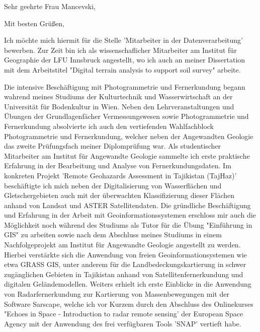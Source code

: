 \documentclass[11pt,a4paper,sans]{moderncv}        %
\begin{document}

\date{22. Nov, 2018}
\opening{Sehr geehrte Frau Mancevski,}
\closing{Mit besten Gr\"{u}{\ss}en,}

\makelettertitle
\justify
Ich m\"{o}chte mich hiermit f\"{u}r die Stelle 'Mitarbeiter in der Datenverarbeitung' bewerben. Zur Zeit bin ich als wissenschaflicher Mitarbeiter am Institut f\"{u}r Geographie der LFU Innsbruck angestellt, wo ich auch an meiner Dissertation mit dem Arbeitstitel "Digital terrain analysis to support soil survey" arbeite.

Die intensive Besch\"{a}ftigung mit Photogrammetrie und Fernerkundung begann wahrend  meines Studiums der Kulturtechnik und Wasserwirtschaft an der Universit\"{a}t f\"{u}r Bodenkultur in Wien. Neben den Lehrveranstaltungen und \"{U}bungen der Grundlagenf\"{a}cher Vermessungswesen sowie Photogrammetrie und Fernerkundung absolvierte ich auch den vertiefenden Wahlfachblock Photogrammetrie und Fernerkundung, welcher neben der Angewandten Geologie das zweite Pr\"{u}fungsfach meiner Diplompr\"{u}fung war. Als studentischer Mitarbeiter am Institut f\"{u}r Angewandte Geologie sammelte ich erste praktische Erfahrung in der Bearbeitung und Analyse von Fernerkundungsdaten. Im konkreten Projekt 'Remote Geohazards Assessment in Tajikistan (TajHaz)' besch\"{a}ftigte ich mich neben der Digitalisierung von Wasserfl\"achen und Gletschergebieten auch mit der \"uberwachten Klassifizierung dieser Fl\"achen anhand von Landsat und ASTER Satellitendaten.  Die gr\"undliche Besch\"aftigung und Erfahrung in der Arbeit mit Geoinformationssystemen erschloss mir auch die M\"oglichkeit noch w\"ahrend des Studiums als Tutor f\"{u}r die \"{U}bung "Einf\"uhrung in GIS" zu arbeiten sowie nach dem Abschluss meines Studiums in einem Nachfolgeprojekt am Institut f\"{u}r Angewandte Geologie angestellt zu werden. Hierbei verst\"arkte sich die Anwendung von freien Geoinformationsystemen wie etwa GRASS GIS, unter anderem f\"{u}r die Landbedeckungskartierung in schwer zug\"anglichen Gebieten in Tajikistan anhand von Satellitenfernerkundung und digitalen Gel\"andemodellen. Weiters erhielt ich erste Einblicke in die Anwendung von Radarfernerkundung zur Kartierung von Massenbewegungen mit der Software Sarscape, welche ich vor Kurzem durch den Abschluss des Onlinekurses "Echoes in Space - Introduction to radar remote sensing' der European Space Agency mit der Anwendung des frei verf\"ugbaren Tools 'SNAP' vertieft habe.
\end{document}
